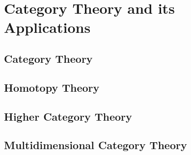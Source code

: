 \documentclass[12pt]{report}
\begin{document}
\part{Category Theory and its Applications}\label{part:category-theory-its}
\chapter{Category Theory}\label{cha:category-theory}
\chapter{Homotopy Theory}\label{cha:homotopy-theory}
\chapter{Higher Category Theory}\label{cha:high-categ-theory}
\chapter{Multidimensional Category Theory}\label{cha:mult-categ-theory}

\printbibliography%
\end{document}

